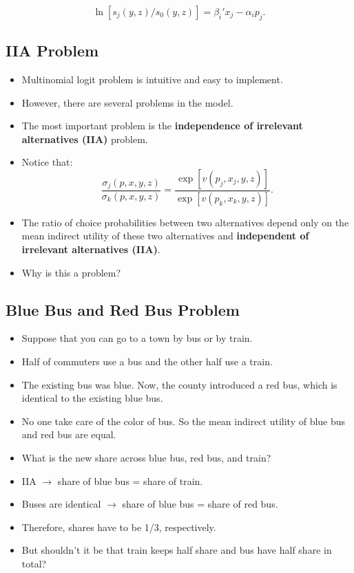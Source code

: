 \documentclass[
]{book}
\providecommand{\tightlist}{%
  \setlength{\itemsep}{0pt}\setlength{\parskip}{0pt}}
\begin{document}
\begin{equation}
\ln[s_{j}(y, z)/s_{0}(y, z)] = \beta_i' x_j - \alpha_i p_j.
\end{equation}

\hypertarget{iia-problem}{%
\subsection{IIA Problem}\label{iia-problem}}

\begin{itemize}
\tightlist
\item
  Multinomial logit problem is intuitive and easy to implement.
\item
  However, there are several problems in the model.
\item
  The most important problem is the \textbf{independence of irrelevant alternatives (IIA)} problem.
\item
  Notice that:
  \begin{equation}
  \frac{\sigma_j(p, x, y, z)}{\sigma_{k}(p, x, y, z)} = \frac{\exp[v(p_j, x_j, y, z)]}{\exp[v(p_k, x_k, y, z)]}.
  \end{equation}
\item
  The ratio of choice probabilities between two alternatives depend only on the mean indirect utility of these two alternatives and \textbf{independent of irrelevant alternatives (IIA)}.
\item
  Why is this a problem?
\end{itemize}

\hypertarget{blue-bus-and-red-bus-problem}{%
\subsection{Blue Bus and Red Bus Problem}\label{blue-bus-and-red-bus-problem}}

\begin{itemize}
\tightlist
\item
  Suppose that you can go to a town by bus or by train.
\item
  Half of commuters use a bus and the other half use a train.
\item
  The existing bus was blue. Now, the county introduced a red bus, which is identical to the existing blue bus.
\item
  No one take care of the color of bus. So the mean indirect utility of blue bus and red bus are equal.
\item
  What is the new share across blue bus, red bus, and train?
\item
  IIA \(\to\) share of blue bus = share of train.
\item
  Buses are identical \(\to\) share of blue bus = share of red bus.
\item
  Therefore, shares have to be 1/3, respectively.
\item
  But shouldn't it be that train keeps half share and bus have half share in total?
\end{itemize}
\end{document}
